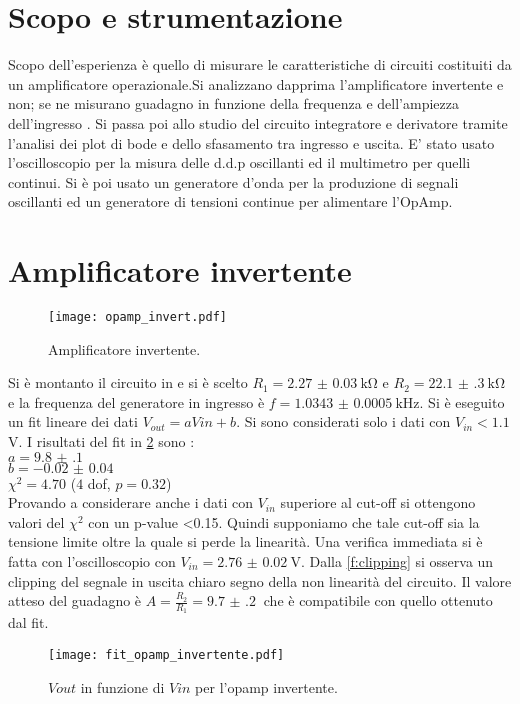 \section{Scopo e strumentazione}
Scopo dell'esperienza è quello di misurare le caratteristiche di circuiti costituiti da un amplificatore operazionale.Si analizzano dapprima l'amplificatore invertente e non; se ne misurano guadagno in funzione della frequenza e dell'ampiezza dell'ingresso . Si passa poi allo studio del circuito integratore e derivatore tramite l'analisi dei plot di bode e dello sfasamento tra ingresso e uscita. E' stato usato l'oscilloscopio per la misura delle d.d.p oscillanti ed il multimetro per quelli continui. Si è poi usato un generatore d'onda per la produzione di segnali oscillanti ed un generatore di tensioni continue per alimentare l'OpAmp.

\section{Amplificatore invertente}
\begin{figure}[h]
	\centering
	\texttt{[image: opamp\_invert.pdf]}
	\caption{Amplificatore invertente.}
	\label{f:opamp_inv}
\end{figure}

Si è montanto il circuito in  e si è scelto $R_1= \SI{2.27(3)}{\kohm}$ e $R_2= \SI{22.1(3)}{\kohm}$ e la frequenza del generatore in ingresso è $f= \SI{1.0343(5)}{\kHz}$. Si è eseguito un fit lineare dei dati $V_{out} = aV{in}+b$. Si sono considerati solo i dati con $V_{in}<1.1$ V. I risultati del fit in \ref{f:guad_inv} sono :\\
$a= \SI{9.8(1)}{}$\\
$b= \SI{-0.02(4)}{}$\\
$\chi^2=4.70$ ($4$ dof, $p = 0.32$)\\
Provando a considerare anche i dati con $V_{in}$ superiore al cut-off si ottengono valori del $\chi^2$ con un p-value <0.15. Quindi supponiamo che tale cut-off sia la tensione limite oltre la quale si perde la linearità. Una verifica immediata si è fatta con l'oscilloscopio con $V_{in}=\SI{2.76(2)}{\V}$. Dalla \ref{f:clipping} si osserva un clipping del segnale in uscita chiaro segno della non linearità del circuito.
Il valore atteso del guadagno è $A= \frac{R_2}{R_1}= \SI{9.7(2)}{}$ che è compatibile con quello ottenuto dal fit.


\begin{figure}[h]
	\centering
	\texttt{[image: fit\_opamp\_invertente.pdf]}
	\caption{$V{out}$ in funzione di $V{in}$ per l'opamp invertente.}
	\label{f:guad_inv}
\end{figure}

